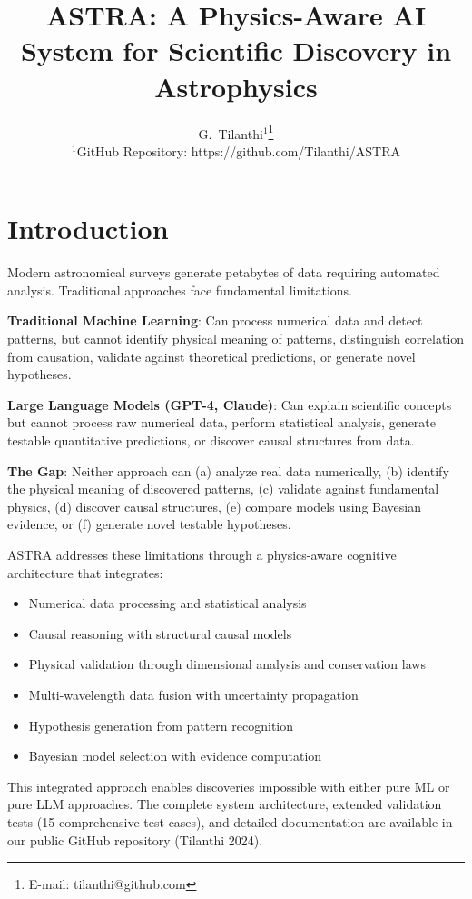 \documentclass[usenatbib]{rasti}
\title[ASTRA: Physics-Aware AI for Astrophysical Discovery]{ASTRA: A Physics-Aware AI System for Scientific Discovery in Astrophysics}
\author[Tilanthi et al.]{G.~Tilanthi$^{1}$\thanks{E-mail: tilanthi@github.com}
\\
$^{1}$GitHub Repository: https://github.com/Tilanthi/ASTRA
}
\begin{document}

\maketitle

\label{firstpage}

\section{Introduction}

Modern astronomical surveys generate petabytes of data requiring automated analysis. Traditional approaches face fundamental limitations.

\textbf{Traditional Machine Learning}: Can process numerical data and detect patterns, but cannot identify physical meaning of patterns, distinguish correlation from causation, validate against theoretical predictions, or generate novel hypotheses.

\textbf{Large Language Models (GPT-4, Claude)}: Can explain scientific concepts but cannot process raw numerical data, perform statistical analysis, generate testable quantitative predictions, or discover causal structures from data.

\textbf{The Gap}: Neither approach can (a) analyze real data numerically, (b) identify the physical meaning of discovered patterns, (c) validate against fundamental physics, (d) discover causal structures, (e) compare models using Bayesian evidence, or (f) generate novel testable hypotheses.

ASTRA addresses these limitations through a physics-aware cognitive architecture that integrates:
\begin{itemize}
\item Numerical data processing and statistical analysis
\item Causal reasoning with structural causal models
\item Physical validation through dimensional analysis and conservation laws
\item Multi-wavelength data fusion with uncertainty propagation
\item Hypothesis generation from pattern recognition
\item Bayesian model selection with evidence computation
\end{itemize}

This integrated approach enables discoveries impossible with either pure ML or pure LLM approaches. The complete system architecture, extended validation tests (15 comprehensive test cases), and detailed documentation are available in our public GitHub repository (Tilanthi 2024)\cite{astra_github}.
\end{document}
